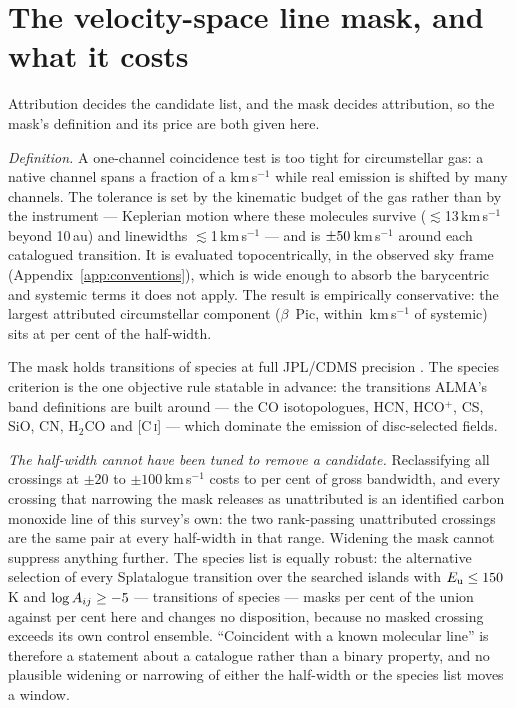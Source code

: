 \section{The velocity-space line mask, and what it costs}
\label{app:linemask}


Attribution decides the candidate list, and the mask decides attribution, so
the mask's definition and its price are both given here.

\emph{Definition.} A one-channel coincidence test is too tight for
circumstellar gas: a native channel spans a fraction of a km\,s$^{-1}$ while
real emission is shifted by many channels. The tolerance is set by the
kinematic budget of the gas rather than by the instrument --- Keplerian
motion where these molecules survive ($\lesssim$13\,km\,s$^{-1}$ beyond
10\,au) and linewidths $\lesssim$1\,km\,s$^{-1}$ --- and is
$\pm50$\,km\,s$^{-1}$ around each catalogued transition. It is
evaluated topocentrically, in the observed sky frame
(Appendix~\ref{app:conventions}), which is wide enough to absorb the
barycentric and systemic terms it does not apply. The result is empirically
conservative: the largest attributed circumstellar component ($\beta$~Pic,
within \BpicMaxAbsStel\,km\,s$^{-1}$ of systemic) sits at \BpicMaskPct{} per
cent of the half-width.

The mask holds \MaskNTransNew{} transitions of \MaskNSpecNew{} species at
full JPL/CDMS precision \citep{Pickett1998,CDMS2005}. The species criterion
is the one objective rule statable in advance: the transitions ALMA's band
definitions are built around --- the CO isotopologues, HCN, HCO$^{+}$, CS,
SiO, CN, H$_2$CO and [C\,\textsc{i}] --- which dominate the emission of
disc-selected fields.

\emph{The half-width cannot have been tuned to remove a candidate.}
Reclassifying all \NCross{} crossings at $\pm20$ to $\pm100$\,km\,s$^{-1}$
costs \MaskBWTwenty{} to \MaskBWHundred{} per cent of gross bandwidth, and
every crossing that narrowing the mask releases as unattributed is an
identified carbon monoxide line of this survey's own: the two rank-passing
unattributed crossings are the same pair at every half-width in that range.
Widening the mask cannot suppress anything further. The species list is
equally robust: the alternative selection of every Splatalogue transition
over the \UnionIntervals{} searched islands with $E_{\rm u}\le150$\,K
and $\log A_{ij}\ge-5$ --- \MaskDbTrans{} transitions of
\MaskDbCarriers{} species --- masks \MaskDbPctUnion{} per cent of the union
against \MaskUnionPct{} per cent here and changes no disposition, because no
masked crossing exceeds its own control ensemble. ``Coincident with a known
molecular line'' is therefore a statement about a catalogue rather than a
binary property, and no plausible widening or narrowing of either the
half-width or the species list moves a window.


